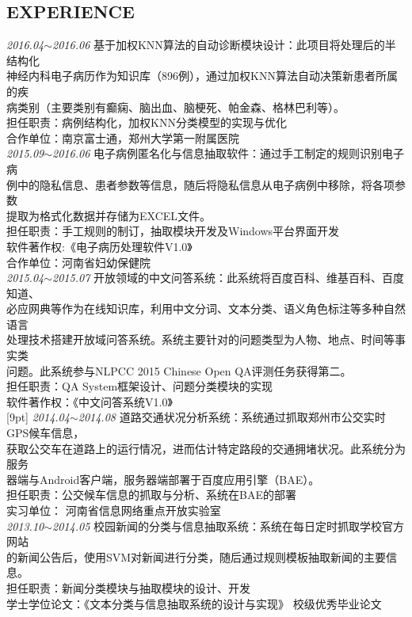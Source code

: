\documentclass[line, margin]{res}
\newcommand{\xiaowu}{\fontsize{9pt}{15.75pt}\selectfont} %
\begin{document}
\begin{resume}
\section{EXPERIENCE}
 { 
 {\sl 2016.04$\sim$2016.06} 基于加权KNN算法的自动诊断模块设计：{ 此项目将处理后的半结构化\\
 神经内科电子病历作为知识库（896例），通过加权KNN算法自动决策新患者所属的疾\\
 病类别（主要类别有癫痫、脑出血、脑梗死、帕金森、格林巴利等）。\\
 {\xiaowu 担任职责：病例结构化，加权KNN分类模型的实现与优化}\\
 {\xiaowu 合作单位：南京富士通，郑州大学第一附属医院} }\\
[9pt]   
 {\sl 2015.09$\sim$2016.06} 电子病例匿名化与信息抽取软件：{ 通过手工制定的规则识别电子病\\
 例中的隐私信息、患者参数等信息，随后将隐私信息从电子病例中移除，将各项参数\\
 提取为格式化数据并存储为EXCEL文件。\\
 {\xiaowu 担任职责：手工规则的制订，抽取模块开发及Windows平台界面开发}\\
 {\xiaowu 软件著作权:《电子病历处理软件V1.0》} \\
 {\xiaowu 合作单位：河南省妇幼保健院} }\\
[9pt]
 {\sl 2015.04$\sim$2015.07} 开放领域的中文问答系统：{ 此系统将百度百科、维基百科、百度知道、\\
 必应网典等作为在线知识库，利用中文分词、文本分类、语义角色标注等多种自然语言\\
 处理技术搭建开放域问答系统。系统主要针对的问题类型为人物、地点、时间等事实类\\
 问题。此系统参与NLPCC 2015 Chinese Open QA评测任务获得第二。}\\
 {\xiaowu 担任职责：QA System框架设计、问题分类模块的实现}\\
 {\xiaowu 软件著作权：《中文问答系统V1.0》} \\
[9pt]
 {\sl 2014.04$\sim$2014.08} 道路交通状况分析系统：{ 系统通过抓取郑州市公交实时GPS候车信息，\\
 获取公交车在道路上的运行情况，进而估计特定路段的交通拥堵状况。此系统分为服务\\
 器端与Android客户端，服务器端部署于百度应用引擎（BAE）。 \\
 {\xiaowu 担任职责：公交候车信息的抓取与分析、系统在BAE的部署}\\
 {\xiaowu 实习单位： 河南省信息网络重点开放实验室} }\\
[9pt]
 {\sl 2013.10$\sim$2014.05} 校园新闻的分类与信息抽取系统：{ 系统在每日定时抓取学校官方网站\\
 的新闻公告后，使用SVM对新闻进行分类，随后通过规则模板抽取新闻的主要信息。}\\
 {\xiaowu 担任职责：新闻分类模块与抽取模块的设计、开发}\\
 {\xiaowu 学士学位论文：《文本分类与信息抽取系统的设计与实现》 校级优秀毕业论文}} \\
 

\end{resume}
\end{document}
